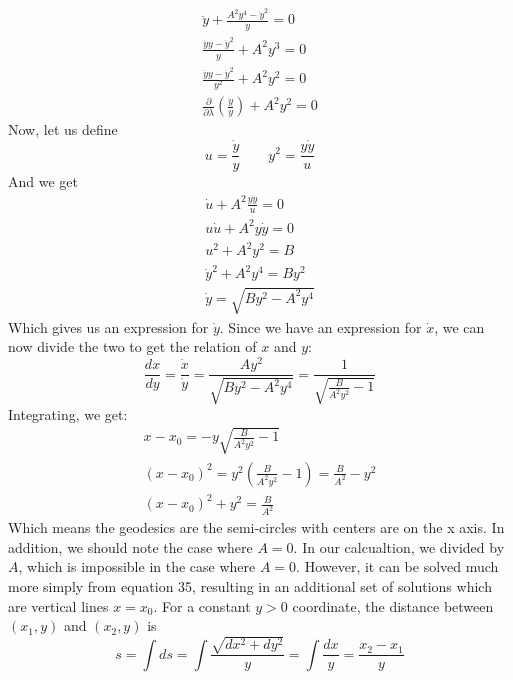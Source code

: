 \documentclass{article}
\begin{document}
\begin{equation}
\begin{gathered}
    \ddot{y} + \frac{A^2y^4 - \dot{y}^2}{y} = 0
    \\
    \frac{\ddot{y}y - \dot{y}^2}{y} + A^2y^3 = 0
    \\
    \frac{\ddot{y}y - \dot{y}^2}{y^2} + A^2y^2 = 0
    \\
    \frac{\partial}{\partial \lambda}\left(\frac{\dot{y}}{y}\right) + A^2y^2 = 0
\end{gathered}
\end{equation}
Now, let us define
\begin{equation}
    u = \frac{\dot{y}}{y}
    \qquad y^2 = \frac{y\dot{y}}{u}
\end{equation}
And we get
\begin{equation}
\begin{gathered}
    \dot{u} + A^2\frac{y\dot{y}}{u} = 0
    \\
    u\dot{u} + A^2y\dot{y} = 0
    \\
    u^2 + A^2y^2 = B
    \\
    \dot{y}^2 + A^2 y^4 = By^2
    \\
    \dot{y} = \sqrt{By^2-A^2y^4}
\end{gathered}
\end{equation}
Which gives us an expression for $\dot{y}$. Since we have an expression for $\dot{x}$, we can now divide the two to get the relation of $x$ and $y$:
\begin{equation}
    \frac{dx}{dy} = \frac{\dot{x}}{\dot{y}} = \frac{Ay^2}{\sqrt{By^2-A^2y^4}} = \frac{1}{\sqrt{\frac{B}{A^2y^2}-1}}
\end{equation}
Integrating, we get:
\begin{equation}
\begin{gathered}
    x - x_0 = -y \sqrt{\frac{B}{A^2y^2}-1}
    \\
    \left(x - x_0\right)^2 = y^2 \left(\frac{B}{A^2y^2}-1\right) = \frac{B}{A^2} - y^2
    \\
    \left(x - x_0\right)^2 + y^2 = \frac{B}{A^2}
\end{gathered}
\end{equation}
Which means the geodesics are the semi-circles with centers are on the x axis. In addition, we should note the case where $A = 0$. In our calcualtion, we divided by $A$, which is impossible in the case where $A = 0$. However, it can be solved much more simply from equation 35, resulting in an additional set of solutions which are vertical lines $x = x_0$.
\newline
For a constant $y > 0$ coordinate, the distance between $(x_1,y)$ and $(x_2,y)$ is
\begin{equation}
    s = \int ds = \int \frac{\sqrt{dx^2+dy^2}}{y} = \int \frac{dx}{y} = \frac{x_2 - x_1}{y}
\end{equation}
\end{document}
